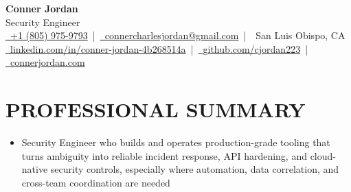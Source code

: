 \documentclass[letterpaper,10pt]{article}
\newcommand{\resumeSubHeadingListStart}{\begin{itemize}[leftmargin=0in,label={}]}
\newcommand{\resumeSubHeadingListEnd}{\end{itemize}}
\begin{document}
\begin{center}
  {\Huge \textbf{Conner Jordan}}\\[0pt]
  {\Large Security Engineer}\\[0pt]
  \href{tel:+18059759793}{\faPhone\ +1 (805) 975-9793} \,|\, 
  \href{mailto:connercharlesjordan@gmail.com}{\faEnvelope\ connercharlesjordan@gmail.com} \,|\, 
  \faMapMarker\ San Luis Obispo, CA \\[-2pt]
  \href{https://www.linkedin.com/in/conner-jordan-4b268514a/}{\faLinkedin\ linkedin.com/in/conner-jordan-4b268514a}
  \,|\, \href{https://github.com/cjordan223}{\faGithub\ github.com/cjordan223}
  \,|\, \href{https://connerjordan.com/}{\faGlobe\ connerjordan.com}
\end{center}

\vspace{4pt}

\section{PROFESSIONAL SUMMARY}
\vspace{8pt}
\resumeSubHeadingListStart
\item {\small
Security Engineer who builds and operates production-grade tooling that turns ambiguity into reliable incident response, API hardening, and cloud-native security controls, especially where automation, data correlation, and cross-team coordination are needed}
\resumeSubHeadingListEnd
\vspace{6pt}

\end{document}
